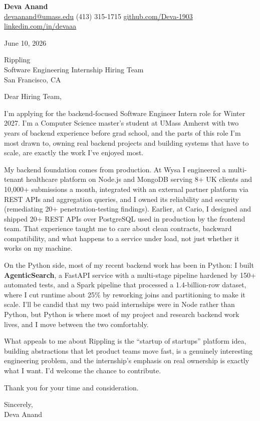 \documentclass[letterpaper,11pt]{article}
\begin{document}
\begin{center}
  {\LARGE \bfseries \textcolor{ResumeNavy}{Deva Anand}} \\[3pt]
  {\small
  \href{mailto:devaanand@umass.edu}{devaanand@umass.edu} \enspace\textbar\enspace
  (413) 315-1715 \enspace\textbar\enspace
  \href{https://github.com/Deva-1903}{github.com/Deva-1903} \enspace\textbar\enspace
  \href{https://linkedin.com/in/devaaa/}{linkedin.com/in/devaaa}}
\end{center}
\vspace{6pt}

June 10, 2026

\vspace{2pt}
Rippling \\
Software Engineering Internship Hiring Team \\
San Francisco, CA

\vspace{6pt}
Dear Hiring Team,

I'm applying for the backend-focused Software Engineer Intern role for Winter 2027. I'm a Computer Science master's student at UMass Amherst with two years of backend experience before grad school, and the parts of this role I'm most drawn to, owning real backend projects and building systems that have to scale, are exactly the work I've enjoyed most.

My backend foundation comes from production. At Wysa I engineered a multi-tenant healthcare platform on Node.js and MongoDB serving 8+ UK clients and 10,000+ submissions a month, integrated with an external partner platform via REST APIs and aggregation queries, and I owned its reliability and security (remediating 20+ penetration-testing findings). Earlier, at Cario, I designed and shipped 20+ REST APIs over PostgreSQL used in production by the frontend team. That experience taught me to care about clean contracts, backward compatibility, and what happens to a service under load, not just whether it works on my machine.

On the Python side, most of my recent backend work has been in Python: I built \textbf{AgenticSearch}, a FastAPI service with a multi-stage pipeline hardened by 150+ automated tests, and a Spark pipeline that processed a 1.4-billion-row dataset, where I cut runtime about 25\% by reworking joins and partitioning to make it scale. I'll be candid that my two paid internships were in Node rather than Python, but Python is where most of my project and research backend work lives, and I move between the two comfortably.

What appeals to me about Rippling is the ``startup of startups'' platform idea, building abstractions that let product teams move fast, is a genuinely interesting engineering problem, and the internship's emphasis on real ownership is exactly what I want. I'd welcome the chance to contribute.

\vspace{4pt}
Thank you for your time and consideration.

\vspace{8pt}
Sincerely, \\
Deva Anand
\end{document}
